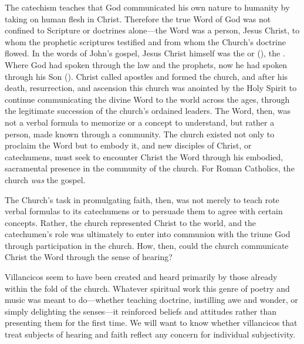 
The catechism teaches that God communicated his own nature to humanity by taking on human flesh in Christ.
Therefore the true Word of God was not confined to Scripture or doctrines alone---the Word was a person, Jesus Christ, to whom the prophetic scriptures testified and from whom the Church's doctrine flowed.
In the words of John's gospel, Jesus Christ himself was the  or  (), the .
Where God had spoken through the law and the prophets, now he had spoken through his Son ().
Christ called apostles and formed the church, and after his death, resurrection, and ascension this church was anointed by the Holy Spirit to continue communicating the divine Word to the world across the ages, through the legitimate succession of the church's ordained leaders.
The Word, then, was not a verbal formula to memorize or a concept to understand, but rather a person, made known through a community.
The church existed not only to proclaim the Word but to embody it, and new disciples of Christ, or catechumens, must seek to encounter Christ the Word through his embodied, sacramental presence in the community of the church.
For Roman Catholics, the church \emph{was} the gospel.

The Church's task in promulgating faith, then, was not merely to teach rote verbal formulas to its catechumens or to persuade them to agree with certain concepts.
Rather, the church represented Christ to the world, and the catechumen's role was ultimately to enter into communion with the triune God through participation in the church.
How, then, could the church communicate Christ the Word through the sense of hearing?


Villancicos seem to have been created and heard primarily by those already within the fold of the church.
Whatever spiritual work this genre of poetry and music was meant to do---whether teaching doctrine, instilling awe and wonder, or simply delighting the senses---it reinforced beliefs and attitudes rather than presenting them for the first time.
We will want to know whether villancicos that treat subjects of hearing and faith reflect any concern for individual subjectivity.

